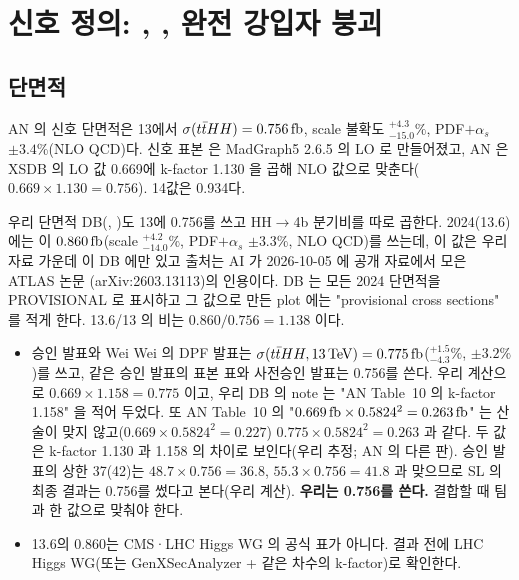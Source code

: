 \section{신호 정의: \texorpdfstring{\ttHH, \HHfourb, \ttbar}{ttHH, HH to 4b, ttbar} 완전 강입자 붕괴}\label{sec:intro-signal}

\subsection{단면적}\label{sec:intro-xsec}

AN 의 신호 단면적은 13\TeV 에서 $\sigma(t\bar{t}HH)=0.756\,\mathrm{fb}$, scale 불확도 $^{+4.3}_{-15.0}\%$, PDF$+\alpha_s$ $\pm3.4\%$(NLO QCD)다.
신호 표본  은 MadGraph5 2.6.5 의 LO 로 만들어졌고,
AN 은 XSDB 의 LO 값 0.669\fb 에 k-factor 1.130 을 곱해 NLO 값으로 맞춘다($0.669\times1.130=0.756$).
14\TeV 값은 0.934\fb 다.

우리 단면적 DB(, )도 13\TeV 에 0.756\fb 를 쓰고 HH$\to$4b 분기비를 따로
곱한다. 2024(13.6\TeV)에는  이 $0.860\,\mathrm{fb}$(scale $^{+4.2}_{-14.0}\%$,
PDF$+\alpha_s$ $\pm3.3\%$, NLO QCD)를 쓰는데, 이 값은 우리 자료 가운데 이 DB 에만 있고 출처는 AI 가 2026-10-05 에 공개 자료에서 모은 ATLAS 논문
(arXiv:2603.13113)의 인용이다. DB 는 모든 2024 단면적을 PROVISIONAL 로 표시하고 그 값으로 만든
plot 에는 "provisional cross sections" 를 적게 한다. 13.6/13 의 비는 $0.860/0.756=1.138$ 이다.

\begin{openq}[신호 단면적: 세 값]
\begin{itemize}
  \item 승인 발표와 Wei Wei 의 DPF 발표는 $\sigma(t\bar{t}HH,13\,\mathrm{TeV})=0.775\,\mathrm{fb}$($^{+1.5}_{-4.3}\%$, $\pm3.2\%$)를 쓰고,
        같은 승인 발표의 표본 표와 사전승인 발표는 0.756\fb 를 쓴다. 우리 계산으로 $0.669\times1.158=0.775$ 이고, 우리 DB 의
        note 는 "AN Table~10 의 k-factor 1.158" 을 적어 두었다. 또 AN Table~10 의 "$0.669\,\mathrm{fb}\times0.5824^{2}=0.263\,\mathrm{fb}$" 는 산술이
        맞지 않고($0.669\times0.5824^2=0.227$) $0.775\times0.5824^2=0.263$ 과 같다. 두 값은 k-factor 1.130 과 1.158 의 차이로 보인다(우리 추정; AN 의 다른 판).
        승인 발표의 상한 37(42)\fb 는 $48.7\times0.756=36.8$, $55.3\times0.756=41.8$ 과 맞으므로 SL 의 최종 결과는 0.756\fb 를 썼다고 본다(우리 계산).
        \textbf{우리는 0.756\fb 를 쓴다.} 결합할 때 팀과 한 값으로 맞춰야 한다.
  \item 13.6\TeV 의 0.860\fb 는 CMS·LHC Higgs WG 의 공식 표가 아니다. 결과 전에 LHC Higgs WG(또는 GenXSecAnalyzer + 같은 차수의 k-factor)로 확인한다.
\end{itemize}
\end{openq}

